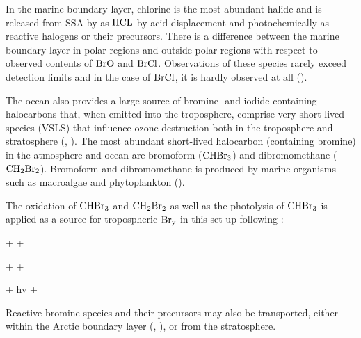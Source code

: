 \medskip


In the marine boundary layer, chlorine is the most abundant halide and is released from SSA by as $\mathrm{HCL}$ by acid displacement and photochemically as reactive halogens or their precursors. There is a difference between the marine boundary layer in polar regions and outside polar regions with respect to observed contents of $\mathrm{BrO}$ and $\mathrm{BrCl}$. Observations of these species rarely exceed detection limits and in the case of $\mathrm{BrCl}$, it is hardly observed at all (\cite{Simpson2015}). 

\medskip

The ocean also provides a large source of bromine- and iodide containing halocarbons that, when emitted into the troposphere, comprise very short-lived species (VSLS) that influence ozone destruction both in the troposphere and stratosphere (\cite{ziska}, \cite{Simpson2015}). The most abundant short-lived halocarbon (containing bromine) in the atmosphere and ocean are bromoform ($\mathrm{CHBr_3}$) and dibromomethane ($\mathrm{CH_2Br_2}$). Bromoform and dibromomethane is produced by marine organisms such as macroalgae and phytoplankton (\cite{Quack2003}).


\medskip

The oxidation of $\mathrm{CHBr_3}$ and $\mathrm{CH_2Br_2}$ as well as the photolysis of $\mathrm{CHBr_3}$ is applied as a source for tropospheric $\mathrm{Br_y}$ in this set-up following \cite{Parella}:


\begin{reaction}
     +   + 
    \label{R:10}
\end{reaction} 
\begin{reaction}
     +   + 
    \label{R:11}
\end{reaction}
\begin{reaction}
     + hv  + 
    \label{R:12}
\end{reaction}

\medskip

Reactive bromine species and their precursors may also be transported, either within the Arctic boundary layer (\cite{Luo2018}, \cite{Schmidt}), or from the stratosphere. 

